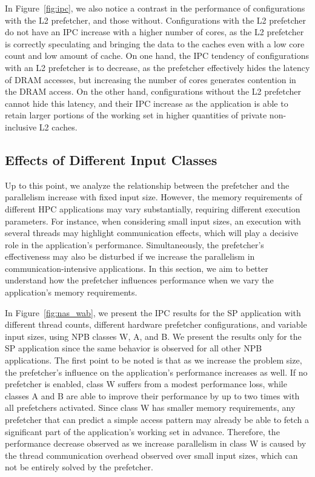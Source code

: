 \documentclass[AMA,final,STIX1COL]{WileyNJD-v2}
\begin{document}
In Figure~\ref{fig:ipc}, we also notice a contrast in the performance of configurations with the L2 prefetcher, and those without.
Configurations with the L2 prefetcher do not have an IPC increase with a higher number of cores, as the L2 prefetcher is correctly speculating and bringing the data to the caches even with a low core count and low amount of cache.
On one hand, the IPC tendency of configurations with an L2 prefetcher is to decrease, as the prefetcher effectively hides the latency of DRAM accesses, but increasing the number of cores generates contention in the DRAM access.
On the other hand, configurations without the L2 prefetcher cannot hide this latency, and their IPC increase as the application is able to retain larger portions of the working set in higher quantities of private non-inclusive L2 caches.



\subsection{Effects of Different Input Classes}
\label{subs:NAS_WAB}


Up to this point, we analyze the relationship between the prefetcher and the parallelism increase with fixed input size.
However, the memory requirements of different HPC applications may vary substantially, requiring different execution parameters. 
For instance, when considering small input sizes, an execution with several threads may highlight communication effects, which will play a decisive role in the application's performance.
Simultaneously, the prefetcher's effectiveness may also be disturbed if we increase the parallelism in communication-intensive applications.
In this section, we aim to better understand how the prefetcher influences performance when we vary the application's memory requirements. 


In Figure~\ref{fig:nas_wab}, we present the IPC results for the SP application with different thread counts, different hardware prefetcher configurations, and variable input sizes, using NPB classes W, A, and B.
We present the results only for the SP application since the same behavior is observed for all other NPB applications.
The first point to be noted is that as we increase the problem size, the prefetcher's influence on the application's performance increases as well. 
If no prefetcher is enabled, class W suffers from a modest performance loss, while classes A and B are able to improve their performance by up to two times with all prefetchers activated.
Since class W has smaller memory requirements, any prefetcher that can predict a simple access pattern may already be able to fetch a significant part of the application's working set in advance.
Therefore, the performance decrease observed as we increase parallelism in class W is caused by the thread communication overhead observed over small input sizes, which can not be entirely solved by the prefetcher.
\end{document}
